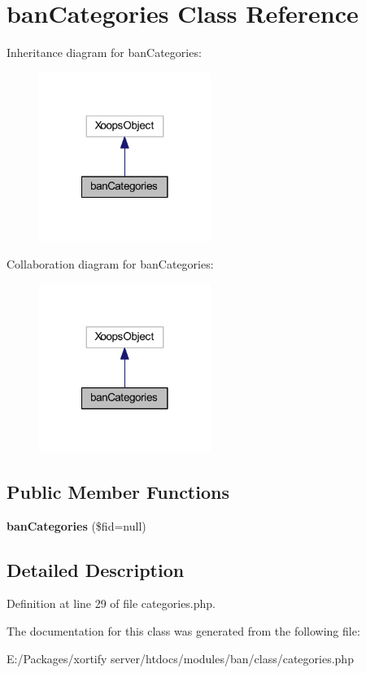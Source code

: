 \hypertarget{classban_categories}{\section{ban\-Categories Class Reference}
\label{classban_categories}
}


Inheritance diagram for ban\-Categories\-:
\nopagebreak
\begin{figure}[H]
\begin{center}
\leavevmode
\includegraphics[width=158pt]{classban_categories__inherit__graph}
\end{center}
\end{figure}


Collaboration diagram for ban\-Categories\-:
\nopagebreak
\begin{figure}[H]
\begin{center}
\leavevmode
\includegraphics[width=158pt]{classban_categories__coll__graph}
\end{center}
\end{figure}
\subsection*{Public Member Functions}
\begin{DoxyCompactItemize}
\item 
\hypertarget{classban_categories_ae103c40150ca8d30a86411cb4621a9fa}{{\bfseries ban\-Categories} (\$fid=null)}\label{classban_categories_ae103c40150ca8d30a86411cb4621a9fa}

\end{DoxyCompactItemize}


\subsection{Detailed Description}


Definition at line 29 of file categories.\-php.



The documentation for this class was generated from the following file\-:\begin{DoxyCompactItemize}
\item 
E\-:/\-Packages/xortify server/htdocs/modules/ban/class/categories.\-php\end{DoxyCompactItemize}
